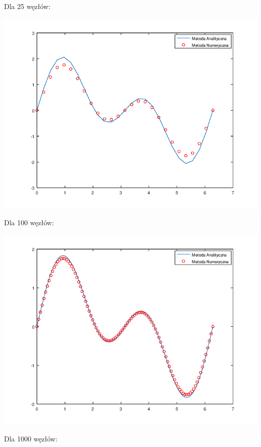 Dla 25 węzłów:

{\centering

\includegraphics{Lab3/charts/zad1/lab_3_1_n_25.png}

}

\newpage

Dla 100 węzłów:

{\centering

\includegraphics{Lab3/charts/zad1/lab_3_1_n_100.png}

}

Dla 1000 węzłów:

